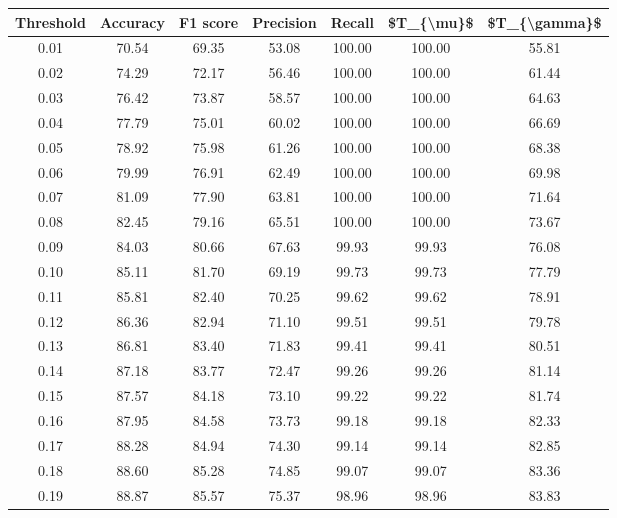 \begin{tabular}{|c|c|c|c|c|c|c|}
\hline
 Threshold &  Accuracy &  F1 score &  Precision &  Recall &  \$T\_\{\textbackslash mu\}\$ &  \$T\_\{\textbackslash gamma\}\$ \\
\hline
      0.01 &     70.54 &     69.35 &      53.08 &  100.00 &     100.00 &         55.81 \\
      0.02 &     74.29 &     72.17 &      56.46 &  100.00 &     100.00 &         61.44 \\
      0.03 &     76.42 &     73.87 &      58.57 &  100.00 &     100.00 &         64.63 \\
      0.04 &     77.79 &     75.01 &      60.02 &  100.00 &     100.00 &         66.69 \\
      0.05 &     78.92 &     75.98 &      61.26 &  100.00 &     100.00 &         68.38 \\
      0.06 &     79.99 &     76.91 &      62.49 &  100.00 &     100.00 &         69.98 \\
      0.07 &     81.09 &     77.90 &      63.81 &  100.00 &     100.00 &         71.64 \\
      0.08 &     82.45 &     79.16 &      65.51 &  100.00 &     100.00 &         73.67 \\
      0.09 &     84.03 &     80.66 &      67.63 &   99.93 &      99.93 &         76.08 \\
      0.10 &     85.11 &     81.70 &      69.19 &   99.73 &      99.73 &         77.79 \\
      0.11 &     85.81 &     82.40 &      70.25 &   99.62 &      99.62 &         78.91 \\
      0.12 &     86.36 &     82.94 &      71.10 &   99.51 &      99.51 &         79.78 \\
      0.13 &     86.81 &     83.40 &      71.83 &   99.41 &      99.41 &         80.51 \\
      0.14 &     87.18 &     83.77 &      72.47 &   99.26 &      99.26 &         81.14 \\
      0.15 &     87.57 &     84.18 &      73.10 &   99.22 &      99.22 &         81.74 \\
      0.16 &     87.95 &     84.58 &      73.73 &   99.18 &      99.18 &         82.33 \\
      0.17 &     88.28 &     84.94 &      74.30 &   99.14 &      99.14 &         82.85 \\
      0.18 &     88.60 &     85.28 &      74.85 &   99.07 &      99.07 &         83.36 \\
      0.19 &     88.87 &     85.57 &      75.37 &   98.96 &      98.96 &         83.83 \\

\end{tabular}
